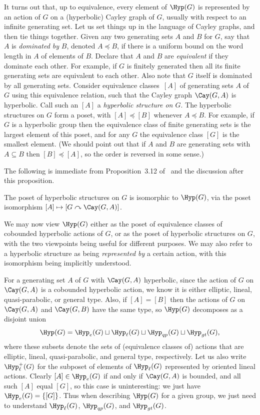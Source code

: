 It turns out that, up to equivalence, every element of $\Hyp(G)$ is represented by an action of $G$ on a (hyperbolic) Cayley graph of $G$, usually with respect to an infinite generating set. Let us set things up in the language of Cayley graphs, and then tie things together. Given any two generating sets $A$ and $B$ for $G$, say that $A$ is \emph{dominated by} $B$, denoted $A\preceq B$, if there is a uniform bound on the word length in $A$ of elements of $B$. Declare that $A$ and $B$ are \emph{equivalent} if they dominate each other. For example, if $G$ is finitely generated then all its finite generating sets are equivalent to each other. Also note that $G$ itself is dominated by all generating sets. Consider equivalence classes~$[A]$ of generating sets $A$ of $G$ using this equivalence relation, such that the Cayley graph $\Cay(G,A)$ is hyperbolic. Call such an $[A]$ a \emph{hyperbolic structure on $G$}. The hyperbolic structures on $G$ form a poset, with $[A]\preccurlyeq [B]$ whenever $A\preceq B$. For example, if $G$ is a hyperbolic group then the equivalence class of finite generating sets is the largest element of this poset, and for any $G$ the equivalence class $[G]$ is the smallest element. (We should point out that if $A$ and $B$ are generating sets with $A\subseteq B$ then $[B]\preccurlyeq [A]$, so the order is reversed in some sense.)

The following is immediate from Proposition~3.12 of~\cite{ABO} and the discussion after this proposition.

\begin{cit}
\label{cit:cayley:representative}

The poset of hyperbolic structures on $G$ is isomorphic to $\Hyp(G)$, via the poset isomorphism $[A]\mapsto [G\curvearrowright \Cay(G,A)]$.
\end{cit}

We may now view $\Hyp(G)$ either as the poset of equivalence classes of cobounded hyperbolic actions of $G$, or as the poset of hyperbolic structures on $G$, with the two viewpoints being useful for different purposes. We may also refer to a hyperbolic structure as being \emph{represented by} a certain action, with this isomorphism being implicitly understood. 

For a generating set $A$ of $G$ with $\Cay(G,A)$ hyperbolic, since the action of $G$ on $\Cay(G,A)$ is a cobounded hyperbolic action, we know it is either elliptic, lineal, quasi-parabolic, or general type. Also, if $[A]=[B]$ then the actions of $G$ on $\Cay(G,A)$ and $\Cay(G,B)$ have the same type, so $\Hyp(G)$ decomposes as a disjoint union
\[
\Hyp(G) = \Hyp_e(G) \sqcup \Hyp_\ell(G) \sqcup \Hyp_{qp}(G) \sqcup \Hyp_{gt}(G)\text{,}
\]
where these subsets denote the sets of (equivalence classes of) actions that are elliptic, lineal, quasi-parabolic, and general type, respectively. Let us also write $\Hyp_\ell^+(G)$ for the subposet of elements of $\Hyp_\ell(G)$ represented by oriented lineal actions. Clearly $[A]\in\Hyp_e(G)$ if and only if $\Cay(G,A)$ is bounded, and all such $[A]$ equal $[G]$, so this case is uninteresting: we just have $\Hyp_e(G)=\{[G]\}$. Thus when describing $\Hyp(G)$ for a given group, we just need to understand $\Hyp_\ell(G)$, $\Hyp_{qp}(G)$, and $\Hyp_{gt}(G)$.


